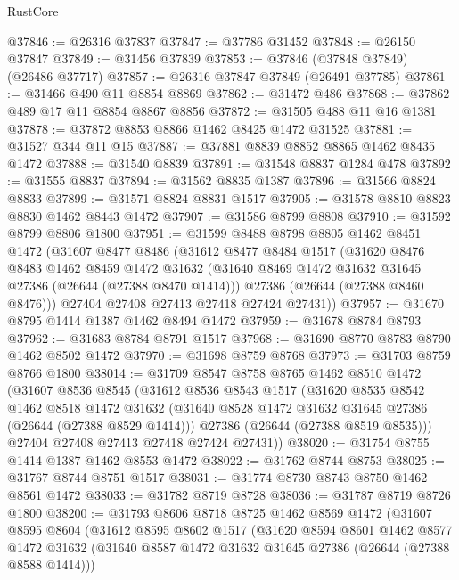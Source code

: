 \begin{lexlean}{RustCore}
\begin{coremodule}
@37846 := @26316 @37837
@37847 := @37786 @31452
@37848 := @26150 @37847
@37849 := @31456 @37839
@37853 := @37846 (@37848 @37849) (@26486 @37717)
@37857 := @26316 @37847 @37849 (@26491 @37785)
@37861 := @31466 @490 @11 @8854 @8869
@37862 := @31472 @486
@37868 := @37862 @489 @17 @11 @8854 @8867 @8856
@37872 := @31505 @488 @11 @16 @1381
@37878 := @37872 @8853 @8866 @1462 @8425 @1472 @31525
@37881 := @31527 @344 @11 @15
@37887 := @37881 @8839 @8852 @8865 @1462 @8435 @1472
@37888 := @31540 @8839
@37891 := @31548 @8837 @1284 @478
@37892 := @31555 @8837
@37894 := @31562 @8835 @1387
@37896 := @31566 @8824 @8833
@37899 := @31571 @8824 @8831 @1517
@37905 := @31578 @8810 @8823 @8830 @1462 @8443 @1472
@37907 := @31586 @8799 @8808
@37910 := @31592 @8799 @8806 @1800
@37951 := @31599
    @8488
    @8798
    @8805
    @1462
    @8451
    @1472
    (@31607
      @8477
      @8486
      (@31612
        @8477
        @8484
        @1517
        (@31620
          @8476
          @8483
          @1462
          @8459
          @1472
          @31632
          (@31640 @8469 @1472 @31632 @31645 @27386 (@26644 (@27388 @8470 @1414)))
          @27386
          (@26644 (@27388 @8460 @8476)))
        @27404
        @27408
        @27413
        @27418
        @27424
        @27431))
@37957 := @31670 @8795 @1414 @1387 @1462 @8494 @1472
@37959 := @31678 @8784 @8793
@37962 := @31683 @8784 @8791 @1517
@37968 := @31690 @8770 @8783 @8790 @1462 @8502 @1472
@37970 := @31698 @8759 @8768
@37973 := @31703 @8759 @8766 @1800
@38014 := @31709
    @8547
    @8758
    @8765
    @1462
    @8510
    @1472
    (@31607
      @8536
      @8545
      (@31612
        @8536
        @8543
        @1517
        (@31620
          @8535
          @8542
          @1462
          @8518
          @1472
          @31632
          (@31640 @8528 @1472 @31632 @31645 @27386 (@26644 (@27388 @8529 @1414)))
          @27386
          (@26644 (@27388 @8519 @8535)))
        @27404
        @27408
        @27413
        @27418
        @27424
        @27431))
@38020 := @31754 @8755 @1414 @1387 @1462 @8553 @1472
@38022 := @31762 @8744 @8753
@38025 := @31767 @8744 @8751 @1517
@38031 := @31774 @8730 @8743 @8750 @1462 @8561 @1472
@38033 := @31782 @8719 @8728
@38036 := @31787 @8719 @8726 @1800
@38200 := @31793
    @8606
    @8718
    @8725
    @1462
    @8569
    @1472
    (@31607
      @8595
      @8604
      (@31612
        @8595
        @8602
        @1517
        (@31620
          @8594
          @8601
          @1462
          @8577
          @1472
          @31632
          (@31640 @8587 @1472 @31632 @31645 @27386 (@26644 (@27388 @8588 @1414)))

\end{coremodule}
\end{lexlean}
